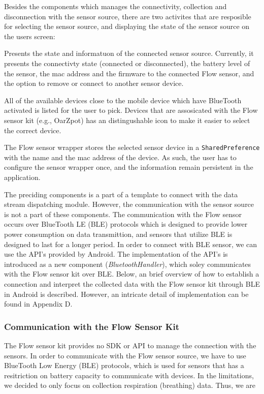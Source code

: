 Besides the components which manages the connectivity, collection and disconnection with the sensor source, there are two activites that are resposible for selecting the sensor source, and displaying the state of the sensor source on the users screen:
\begin{description}[font=\normalfont\itshape]
    \item[MainActivity] Presents the state and informatuon of the connected sensor source. Currently, it presents the connectivty state (connected or disconnected), the battery level of the sensor, the mac address and the firmware to the connected Flow sensor, and the option to remove or connect to another sensor device. 
    \item[DeviceListActivity] All of the available devices close to the mobile device which have BlueTooth activated is listed for the user to pick. Devices that are assosicated with the Flow sensor kit (e.g., OarZpot) has an distingushable icon to make it easier to select the correct device. 
\end{description}
The Flow sensor wrapper stores the selected sensor device in a \verb|SharedPreference| with the name and the mac address of the device. As such, the user has to configure the sensor wrapper once, and the information remain persistent in the application.   

The preciding components is a part of a template to connect with the data stream dispatching module. However, the communication with the sensor source is not a part of these components. The communication with the Flow sensor occurs over BlueTooth LE (BLE) protocols which is designed to provide lower power consumption on data transmittion, and sensors that utilize BLE is designed to last for a longer period. In order to connect with BLE sensor, we can use the API's provided by Android. The implementation of the API's is introduced as a new component (\textit{BluetoothHandler}), which soley communicates with the Flow sensor kit over BLE. Below, an brief overview of how to establish a connection and interpret the collected data with the Flow sensor kit through BLE in Android is described. However, an intricate detail of implementation can be found in Appendix D.


\subsubsection{Communication with the Flow Sensor Kit}
The Flow sensor kit provides no SDK or API to manage the connection with the sensors. In order to communicate with the Flow sensor source, we have to use BlueTooth Low Energy (BLE) protocols, which is used for sensors that has a resitriction on battery capacity to communicate with devices. In the limitations, we decided to only focus on collection respiration (breathing) data. Thus, we are 

